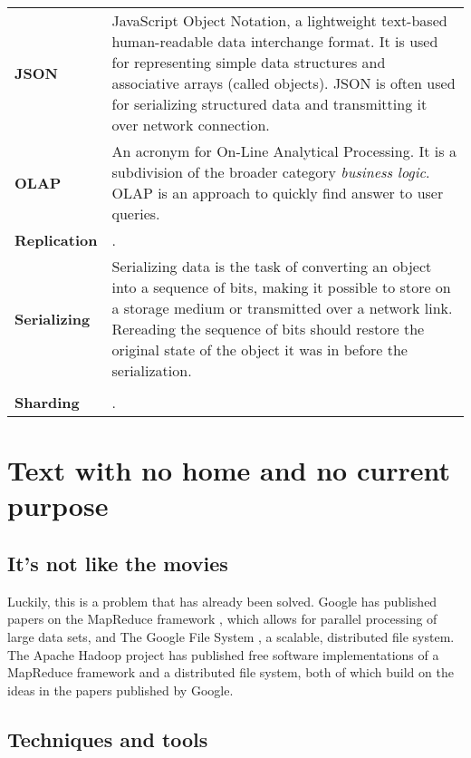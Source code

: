 \begin{tabular}[t]{lp{100mm}}
\textbf{JSON} &
JavaScript Object Notation, a lightweight text-based human-readable data
interchange format. It is used for representing simple data structures and
associative arrays (called objects). JSON is often used for serializing
structured data and transmitting it over network connection.

 \\

\textbf{OLAP} &
An acronym for On-Line Analytical Processing. It is a subdivision of the broader
category \textit{business logic}. OLAP is an approach to quickly find answer to
user queries.

 \\

\textbf{Replication} &
.

 \\

\textbf{Serializing} &
Serializing data is the task of converting an object into a sequence of bits,
making it possible to store on a storage medium or transmitted over a network
link. Rereading the sequence of bits should restore the original state of the
object it was in before the serialization. \\

 \\

\textbf{Sharding} &
.
\end{tabular}



\chapter{Text with no home and no current purpose}

\section{It's not like the movies}

Luckily, this is a problem that has already been solved. Google has published
papers on the MapReduce framework \cite{mapreduce}, which allows for parallel
processing of large data sets, and The Google File System \cite{gfs}, a
scalable, distributed file system. The Apache Hadoop \cite{hadoop} project has
published free software implementations of a MapReduce framework and a
distributed file system, both of which build on the ideas in the papers
published by Google.


\section{Techniques and tools}

